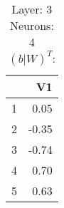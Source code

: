 \begin{table}[ht]
\centering
\begin{tabular}{rr}
  \hline
 & V1 \\ 
  \hline
1 & 0.05 \\ 
  2 & -0.35 \\ 
  3 & -0.74 \\ 
  4 & 0.70 \\ 
  5 & 0.63 \\ 
   \hline
\end{tabular}
\caption{Layer: 3 Neurons: 4  $(b|W)^T$: 
} 
\end{table}
